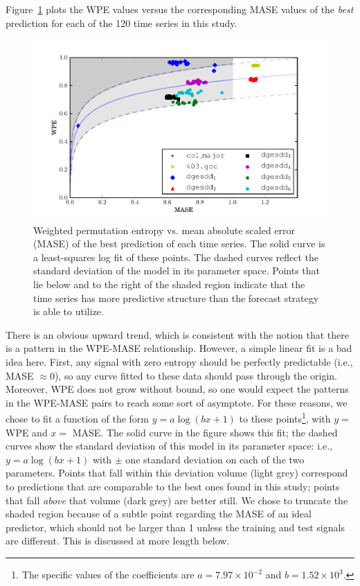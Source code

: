 Figure~\ref{fig:wpe_vs_mase_best} plots the WPE values versus the
corresponding MASE values of the \emph{best} prediction for each of
the 120 time series in this study.
\begin{figure}
  \centering
  \includegraphics[width=1.1\columnwidth]{figs/new_prediction_vs_entropy}
  \caption{Weighted permutation entropy vs. mean absolute scaled error
    (MASE) of the best prediction of each time series.  The solid
    curve is a least-squares log fit of these points.
%
%
The dashed curves reflect the standard deviation of the model in its
parameter space.  Points that lie below and to the right of the shaded
region indicate that the time series has more predictive structure
than the forecast strategy is able to utilize.}
  \label{fig:wpe_vs_mase_best}
\end{figure}
%
%
There is an obvious upward trend, which is consistent with the notion
that there is a pattern in the WPE-MASE relationship.  However, a
simple linear fit is a bad idea here.  First, any signal with zero
entropy should be perfectly predictable (i.e., MASE $\approx 0$), so
any curve fitted to these data should pass through the origin.
Moreover, WPE does not grow without bound, so one would expect the
patterns in the WPE-MASE pairs to reach some sort of asymptote.  For
these reasons, we chose to fit a function of the form $y = a \log(b x
+ 1)$ to these points\footnote{The specific values of the coefficients
  are $a=7.97 \times 10^{-2}$ and $b=1.52 \times 10^3$.}, with $y =$
WPE and $x=$ MASE.  The solid curve in the figure shows this fit; the
dashed curves show the standard deviation of this model in its
parameter space: i.e., $y = a \log(b x + 1)$ with $\pm$ one standard
deviation on each of the two parameters.  Points that fall within this
deviation volume (light grey) correspond to predictions that are
comparable to the best ones found in this study; points that fall
\emph{above} that volume (dark grey) are better still.  We chose to
truncate the shaded region because of a subtle point regarding the
MASE of an ideal predictor, which should not be larger than 1 unless
the training and test signals are different.  This is discussed at
more length below.

